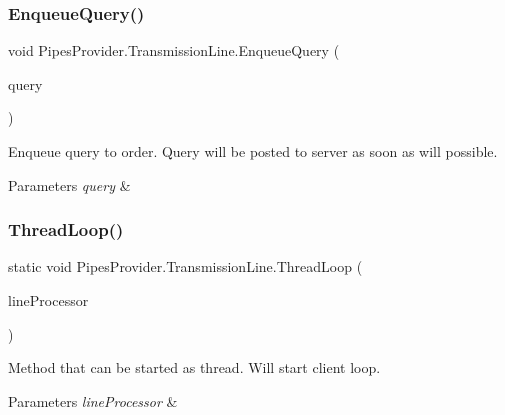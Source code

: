 \subsubsection{\texorpdfstring{Enqueue\+Query()}{EnqueueQuery()}\hspace{0.1cm}{\footnotesize\ttfamily [2/2]}}
{\footnotesize\ttfamily void Pipes\+Provider.\+Transmission\+Line.\+Enqueue\+Query (\begin{DoxyParamCaption}\item[{\mbox{\hyperlink{struct_pipes_provider_1_1_query_container}{Query\+Container}}}]{query }\end{DoxyParamCaption})}



Enqueue query to order. Query will be posted to server as soon as will possible. 


\begin{DoxyParams}{Parameters}
{\em query} & \\
\hline
\end{DoxyParams}
\mbox{\label{class_pipes_provider_1_1_transmission_line_ab56219b10bad03085b5d23e48ad59ec3}} 
\subsubsection{\texorpdfstring{Thread\+Loop()}{ThreadLoop()}}
{\footnotesize\ttfamily static void Pipes\+Provider.\+Transmission\+Line.\+Thread\+Loop (\begin{DoxyParamCaption}\item[{object}]{line\+Processor }\end{DoxyParamCaption})\hspace{0.3cm}{\ttfamily [static]}}



Method that can be started as thread. Will start client loop. 


\begin{DoxyParams}{Parameters}
{\em line\+Processor} & \\
\hline
\end{DoxyParams}
\mbox{\label{class_pipes_provider_1_1_transmission_line_acc672e0d0c921f60a9a5920e3f76d28b}} 
